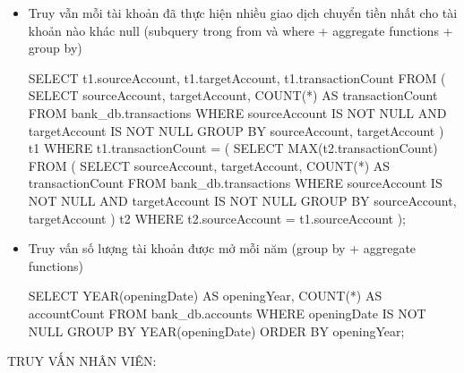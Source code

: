 \begin{itemize}
    \item Truy vẫn mỗi tài khoản đã thực hiện nhiều giao dịch chuyển tiền nhất cho tài khoản nào khác null (subquery trong from và where + aggregate functions + group by)
    \begin{MySQLCode}
    SELECT 
        t1.sourceAccount, 
        t1.targetAccount, 
        t1.transactionCount
    FROM (
        SELECT 
            sourceAccount, 
            targetAccount, 
            COUNT(*) AS transactionCount
        FROM 
            bank_db.transactions
        WHERE 
            sourceAccount IS NOT NULL 
            AND targetAccount IS NOT NULL
        GROUP BY 
            sourceAccount, targetAccount
    ) t1
    WHERE 
        t1.transactionCount = (
            SELECT 
                MAX(t2.transactionCount)
            FROM (
                SELECT 
                    sourceAccount, 
                    targetAccount, 
                    COUNT(*) AS transactionCount
                FROM 
                    bank_db.transactions
                WHERE 
                    sourceAccount IS NOT NULL 
                    AND targetAccount IS NOT NULL
                GROUP BY 
                    sourceAccount, targetAccount
            ) t2
            WHERE 
                t2.sourceAccount = t1.sourceAccount
        );
    \end{MySQLCode}

    \item Truy vấn số lượng tài khoản được mở mỗi năm (group by + aggregate functions)
    \begin{MySQLCode}
    SELECT 
        YEAR(openingDate) AS openingYear,
        COUNT(*) AS accountCount
    FROM 
        bank_db.accounts
    WHERE 
        openingDate IS NOT NULL
    GROUP BY 
        YEAR(openingDate)
    ORDER BY 
        openingYear;
    \end{MySQLCode}

\end{itemize}
TRUY VẤN NHÂN VIÊN:
